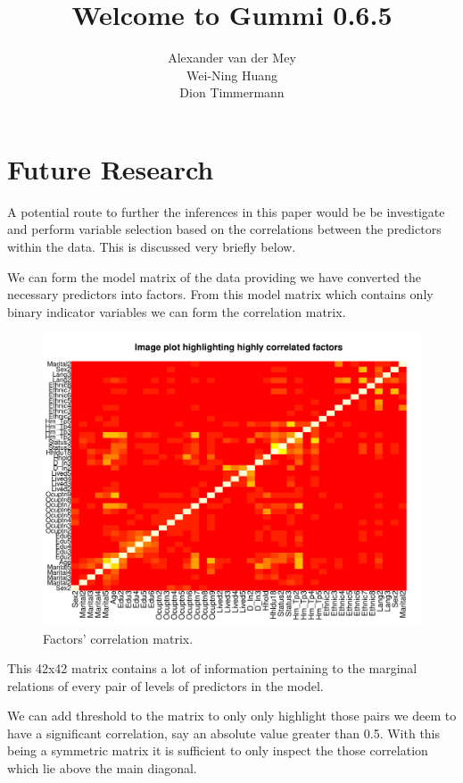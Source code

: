 \documentclass[11pt]{article}
\title{\textbf{Welcome to Gummi 0.6.5}}
\author{Alexander van der Mey\\
		Wei-Ning Huang\\
		Dion Timmermann}
\date{}
\begin{document}
\section{Future Research}
A potential route to further the inferences in this paper would be be investigate and perform variable selection based on the correlations between the predictors within the data. This is discussed very briefly below.

We can form the model matrix of the data providing we have converted the necessary predictors into factors. From this model matrix which contains only binary indicator variables we can form the correlation matrix. 

\begin{figure}[h!]
  \caption{Factors' correlation matrix.}
  \centering
    \includegraphics[width=1.0\textwidth]{FutureResearch/CorrImageNoThresh.pdf}
\end{figure}

This 42x42 matrix contains a lot of information pertaining to the marginal relations of every pair of levels of predictors in the model.

We can add threshold to the matrix to only only highlight those pairs we deem to have a significant correlation, say an absolute value greater than 0.5. With this being a symmetric matrix it is sufficient to only inspect the those correlation which lie above the main diagonal. 
\end{document}
